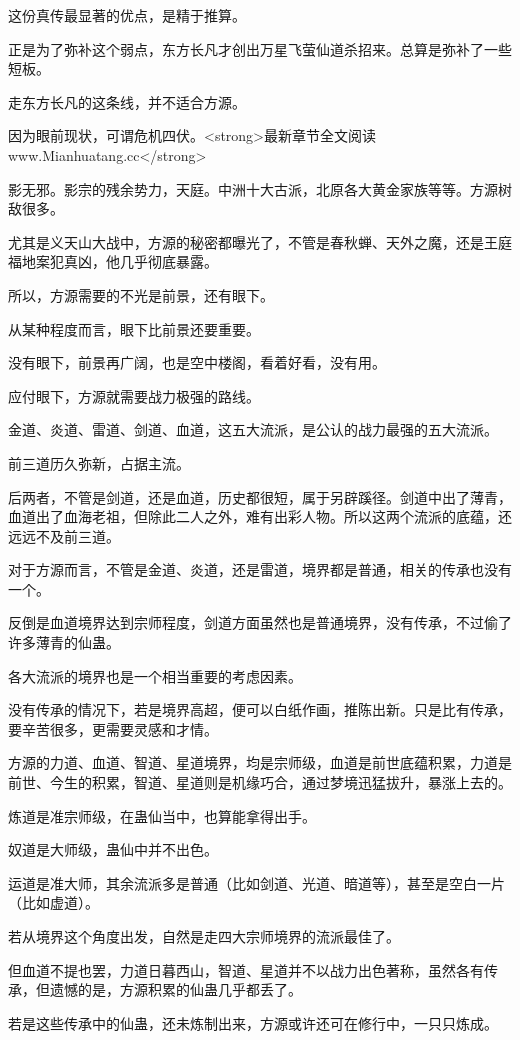 \begin{this_body}
这份真传最显著的优点，是精于推算。

正是为了弥补这个弱点，东方长凡才创出万星飞萤仙道杀招来。总算是弥补了一些短板。

走东方长凡的这条线，并不适合方源。

因为眼前现状，可谓危机四伏。<strong>最新章节全文阅读www.Mianhuatang.cc</strong>

影无邪。影宗的残余势力，天庭。中洲十大古派，北原各大黄金家族等等。方源树敌很多。

尤其是义天山大战中，方源的秘密都曝光了，不管是春秋蝉、天外之魔，还是王庭福地案犯真凶，他几乎彻底暴露。

所以，方源需要的不光是前景，还有眼下。

从某种程度而言，眼下比前景还要重要。

没有眼下，前景再广阔，也是空中楼阁，看着好看，没有用。

应付眼下，方源就需要战力极强的路线。

金道、炎道、雷道、剑道、血道，这五大流派，是公认的战力最强的五大流派。

前三道历久弥新，占据主流。

后两者，不管是剑道，还是血道，历史都很短，属于另辟蹊径。剑道中出了薄青，血道出了血海老祖，但除此二人之外，难有出彩人物。所以这两个流派的底蕴，还远远不及前三道。

对于方源而言，不管是金道、炎道，还是雷道，境界都是普通，相关的传承也没有一个。

反倒是血道境界达到宗师程度，剑道方面虽然也是普通境界，没有传承，不过偷了许多薄青的仙蛊。

各大流派的境界也是一个相当重要的考虑因素。

没有传承的情况下，若是境界高超，便可以白纸作画，推陈出新。只是比有传承，要辛苦很多，更需要灵感和才情。

方源的力道、血道、智道、星道境界，均是宗师级，血道是前世底蕴积累，力道是前世、今生的积累，智道、星道则是机缘巧合，通过梦境迅猛拔升，暴涨上去的。

炼道是准宗师级，在蛊仙当中，也算能拿得出手。

奴道是大师级，蛊仙中并不出色。

运道是准大师，其余流派多是普通（比如剑道、光道、暗道等），甚至是空白一片（比如虚道）。

若从境界这个角度出发，自然是走四大宗师境界的流派最佳了。

但血道不提也罢，力道日暮西山，智道、星道并不以战力出色著称，虽然各有传承，但遗憾的是，方源积累的仙蛊几乎都丢了。

若是这些传承中的仙蛊，还未炼制出来，方源或许还可在修行中，一只只炼成。


\end{this_body}

